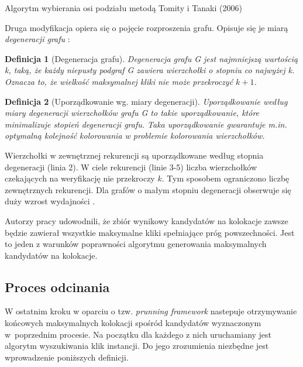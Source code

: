\documentclass[12pt]{article}
\newtheorem{defin}{Definicja}
\begin{document}
\begin{algorithm}

\caption{Algorytm wybierania osi podziału metodą Tomity i Tanaki (2006)}
\label{alg:tomita_tanaka}
\end{algorithm}

Druga modyfikacja opiera się o pojęcie rozproszenia grafu. Opisuje się je miarą \textit{degeneracji grafu} \cite{matusiak}:
\begin{defin}[Degeneracja grafu]
Degeneracja grafu G jest najmniejszą wartością k, taką, że każdy niepusty podgraf G zawiera wierzchołki o stopniu co najwyżej k. Oznacza to, że wielkość maksymalnej kliki nie może przekroczyć $k + 1$.
\label{def:degeneracy}
\end{defin}

\begin{defin}[Uporządkowanie wg. miary degeneracji]
Uporządkowanie według miary degeneracji wierzchołków grafu G to takie uporządkowanie, które minimalizuje stopień degeneracji grafu. Taka uporządkowanie gwarantuje m.in. optymalną kolejność kolorowania w problemie kolorowania wierzchołków.
\end{defin}

Wierzchołki w zewnętrznej rekurencji są uporządkowane według stopnia degeneracji (linia 2). W ciele rekurencji (linie 3-5) liczba wierzchołków czekających na weryfikację nie przekroczy $ k $. Tym sposobem ograniczono liczbę zewnętrznych rekurencji. Dla grafów o małym stopniu degeneracji obserwuje się duży wzrost wydajności \cite{degenerat}.

Autorzy pracy \cite{wang} udowodnili, że zbiór wynikowy kandydatów na kolokacje zawsze będzie zawierał wszystkie maksymalne kliki spełniające próg powszechności. Jest to jeden z warunków poprawności algorytmu generowania maksymalnych kandydatów na kolokacje.

\subsection{Proces odcinania}

W ostatnim kroku w oparciu o tzw. \textit{prunning framework} \cite{wang} nastepuje otrzymywanie końcowych maksymalnych kolokacji spośród kandydatów wyznaczonym w~poprzednim procesie. Na początku dla każdego z nich uruchamiany jest algorytm wyszukiwania klik instancji. Do jego zrozumienia niezbędne jest wprowadzenie poniższych definicji.
\end{document}
